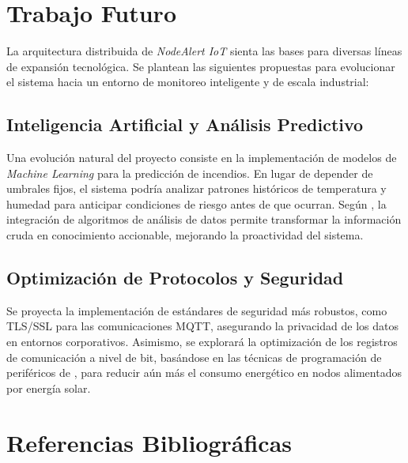 \documentclass[11pt,a4paper]{article}
\begin{document}
\section{Trabajo Futuro}

La arquitectura distribuida de \textit{NodeAlert IoT} sienta las bases para diversas líneas de expansión tecnológica. Se plantean las siguientes propuestas para evolucionar el sistema hacia un entorno de monitoreo inteligente y de escala industrial:

\subsection{Inteligencia Artificial y Análisis Predictivo}
Una evolución natural del proyecto consiste en la implementación de modelos de \textit{Machine Learning} para la predicción de incendios. En lugar de depender de umbrales fijos, el sistema podría analizar patrones históricos de temperatura y humedad para anticipar condiciones de riesgo antes de que ocurran. Según \citet{deitel2004}, la integración de algoritmos de análisis de datos permite transformar la información cruda en conocimiento accionable, mejorando la proactividad del sistema.

\subsection{Optimización de Protocolos y Seguridad}
Se proyecta la implementación de estándares de seguridad más robustos, como TLS/SSL para las comunicaciones MQTT, asegurando la privacidad de los datos en entornos corporativos. Asimismo, se explorará la optimización de los registros de comunicación a nivel de bit, basándose en las técnicas de programación de periféricos de \citet{mazidi2014}, para reducir aún más el consumo energético en nodos alimentados por energía solar.

\section{Referencias Bibliográficas}
\end{document}
